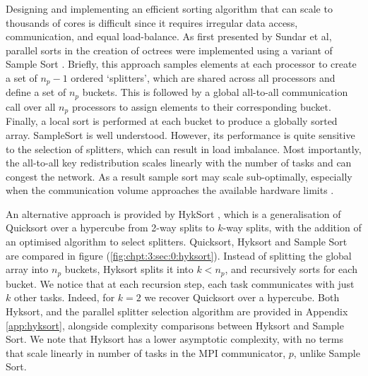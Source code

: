 Designing and implementing an efficient sorting algorithm that can scale to thousands of cores is difficult since it requires irregular data access, communication, and equal load-balance. As first presented by Sundar et al, parallel sorts in the creation of octrees were implemented using a variant of Sample Sort \cite{sundar2008bottom}. Briefly, this approach samples elements at each processor to create a set of $n_p - 1 $ ordered `splitters', which are shared across all processors and define a set of $n_p$ buckets. This is followed by a global all-to-all communication call over all $n_p$ processors to assign elements to their corresponding bucket. Finally, a local sort is performed at each bucket to produce a globally sorted array. SampleSort is well understood. However, its performance is quite sensitive to the selection of splitters, which can result in load imbalance. Most importantly, the all-to-all key redistribution scales linearly with the number of tasks and can congest the network. As a result sample sort may scale sub-optimally, especially when the communication volume approaches the available hardware limits \cite{sundar2013hyksort}.

An alternative approach is provided by HykSort \cite{sundar2013hyksort}, which is a generalisation of Quicksort over a hypercube \cite{wagar1987hyperquicksort} from 2-way splits to $k$-way splits, with the addition of an optimised algorithm to select splitters. Quicksort, Hyksort and Sample Sort are compared in figure (\ref{fig:chpt:3:sec:0:hyksort}). Instead of splitting the global array into $n_p$ buckets, Hyksort splits it into $k < n_p$, and recursively sorts for each bucket. We notice that at each recursion step, each task communicates with just $k$ other tasks. Indeed, for $k=2$ we recover Quicksort over a hypercube. Both Hyksort, and the parallel splitter selection algorithm are provided in Appendix \ref{app:hyksort}, alongside complexity comparisons between Hyksort and Sample Sort. We note that Hyksort has a lower asymptotic complexity, with no terms that scale linearly in number of tasks in the MPI communicator, $p$, unlike Sample Sort.

